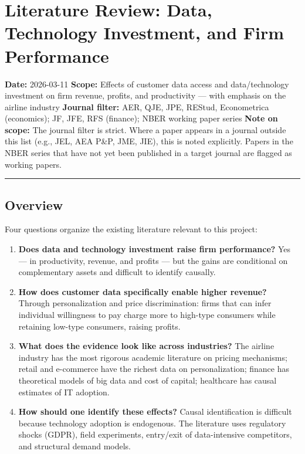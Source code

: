 \documentclass[
]{article}
\author{}
\date{\vspace{-2.5em}}
\providecommand{\tightlist}{%
  \setlength{\itemsep}{0pt}\setlength{\parskip}{0pt}}
\begin{document}
\hypertarget{literature-review-data-technology-investment-and-firm-performance}{%
\section{Literature Review: Data, Technology Investment, and Firm
Performance}\label{literature-review-data-technology-investment-and-firm-performance}}

\textbf{Date:} 2026-03-11 \textbf{Scope:} Effects of customer data
access and data/technology investment on firm revenue, profits, and
productivity --- with emphasis on the airline industry \textbf{Journal
filter:} AER, QJE, JPE, REStud, Econometrica (economics); JF, JFE, RFS
(finance); NBER working paper series \textbf{Note on scope:} The journal
filter is strict. Where a paper appears in a journal outside this list
(e.g., JEL, AEA P\&P, JME, JIE), this is noted explicitly. Papers in the
NBER series that have not yet been published in a target journal are
flagged as working papers.

\begin{center}\rule{0.5\linewidth}{0.5pt}\end{center}

\hypertarget{overview}{%
\subsection{Overview}\label{overview}}

Four questions organize the existing literature relevant to this
project:

\begin{enumerate}
\def\labelenumi{\arabic{enumi}.}
\tightlist
\item
  \textbf{Does data and technology investment raise firm performance?}
  Yes --- in productivity, revenue, and profits --- but the gains are
  conditional on complementary assets and difficult to identify
  causally.
\item
  \textbf{How does customer data specifically enable higher revenue?}
  Through personalization and price discrimination: firms that can infer
  individual willingness to pay charge more to high-type consumers while
  retaining low-type consumers, raising profits.
\item
  \textbf{What does the evidence look like across industries?} The
  airline industry has the most rigorous academic literature on pricing
  mechanisms; retail and e-commerce have the richest data on
  personalization; finance has theoretical models of big data and cost
  of capital; healthcare has causal estimates of IT adoption.
\item
  \textbf{How should one identify these effects?} Causal identification
  is difficult because technology adoption is endogenous. The literature
  uses regulatory shocks (GDPR), field experiments, entry/exit of
  data-intensive competitors, and structural demand models.
\end{enumerate}
\end{document}

